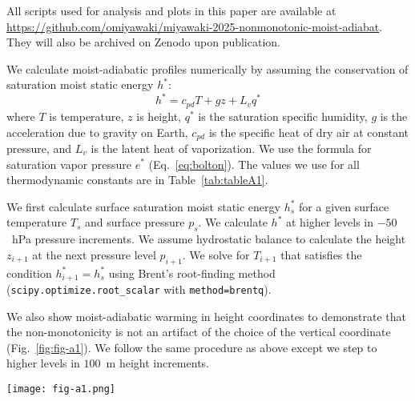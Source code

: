 \documentclass[draft]{ametsocV6.1}
\begin{document}
% 
%
\datastatement
All scripts used for analysis and plots in this paper are available at \url{https://github.com/omiyawaki/miyawaki-2025-nonmonotonic-moist-adiabat}. They will also be archived on Zenodo upon publication.



\appendix[A] 
\label{app:calculation}
We calculate moist-adiabatic profiles numerically by assuming the conservation of saturation moist static energy $h^*$:
\begin{equation}
h^*=c_{pd} T+gz+L_v q^* \label{eq:mse}
\end{equation}
where $T$ is temperature, $z$ is height, $q^*$ is the saturation specific humidity, $g$ is the acceleration due to gravity on Earth, $c_{pd}$ is the specific heat of dry air at constant pressure, and $L_v$ is the latent heat of vaporization. We use the \cite{bolton1980} formula for saturation vapor pressure $e^*$ (Eq.~\ref{eq:bolton}). The values we use for all thermodynamic constants are in Table~\ref{tab:tableA1}. 

We first calculate surface saturation moist static energy $h_s^*$ for a given surface temperature $T_s$ and surface pressure $p_s$. We calculate $h^*$ at higher levels in $-50$~hPa pressure increments. We assume hydrostatic balance to calculate the height $z_{i+1}$ at the next pressure level $p_{i+1}$. We solve for $T_{i+1}$ that satisfies the condition $h_{i+1}^*=h_s^*$ using Brent's root-finding method (\texttt{scipy.optimize.root\_scalar} with \texttt{method=brentq}).

We also show moist-adiabatic warming in height coordinates to demonstrate that the non-monotonicity is not an artifact of the choice of the vertical coordinate (Fig.~\ref{fig:fig-a1}). We follow the same procedure as above except we step to higher levels in $100$~m height increments.

\begin{figure*}[htbp]
 \centering
 \texttt{[image: fig-a1.png]}
 \caption{(a) Vertical profiles of moist-adiabatic warming to a 4~K surface warming for $T_s=$ 280, 290, 300, 310, and 320~K. Warming decreases with initial surface temperature at lower levels while it increases with initial surface temperature at higher levels. (b) moist-adiabatic warming varies non-monotonically with initial surface temperature at all levels, e.g. at 5~km, 10~km, 15~km, and 20~km. moist-adiabatic warming peaks at warmer initial surface temperatures at higher levels.}\label{fig:fig-a1}
\end{figure*}
\end{document}
